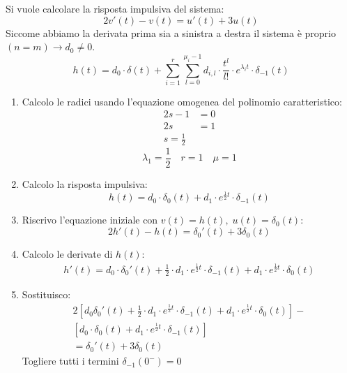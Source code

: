 \documentclass[a4paper]{article}
\begin{document}
\begin{exercise}
  Si vuole calcolare la risposta impulsiva del sistema:
  \[
    2v'(t) - v(t) = u'(t) + 3u(t)
  \] 
  Siccome abbiamo la derivata prima sia a sinistra a destra il sistema è proprio
  \( (n = m) \to d_0 \neq 0 \).
  \[
    h(t) = d_0 \cdot \delta(t) + \sum_{i=1}^{r} \sum_{l=0}^{\mu_i - 1} d_{i,l} \cdot
    \frac{t^l}{l!} \cdot e^{\lambda_i t} \cdot \delta_{-1}(t)
  \] 
  \begin{enumerate}
    \item Calcolo le radici usando l'equazione omogenea del polinomio caratteristico:
      \[
        \begin{aligned}
          2s - 1 &= 0\\
          2s &= 1\\
          s = \frac{1}{2}
        \end{aligned}
      \] 
      \[
        \lambda_1 = \frac{1}{2} \quad r = 1 \quad \mu = 1
      \] 

    \item Calcolo la risposta impulsiva:
      \[
        h(t) = d_0 \cdot \delta_0(t) + d_1 \cdot e^{\frac{1}{2}t} \cdot \delta_{-1}(t)
      \] 

    \item Riscrivo l'equazione iniziale con \( v(t) = h(t),\; u(t) = \delta_0(t) \):
      \[
        2h'(t) - h(t) = \delta_0'(t) + 3\delta_0(t)
      \] 

    \item Calcolo le derivate di \( h(t) \):
      \[
      \begin{aligned}
        h'(t) = d_0 \cdot \delta_0'(t) + \frac{1}{2} \cdot d_1 \cdot e^{\frac{1}{2}t}
        \cdot \delta_{-1}(t) + d_1 \cdot e^{\frac{1}{2}t} \cdot \delta_0(t)
      \end{aligned}
      \] 

    \item Sostituisco:
      \[
        \begin{aligned}
          2 \left[ d_0 \delta_0'(t) + \frac{1}{2} \cdot d_1 \cdot e^{\frac{1}{2}t} \cdot
          \delta_{-1}(t) + d_1 \cdot e^{\frac{1}{2}t} \cdot \delta_0(t) \right] -\\
          \left[ d_0 \cdot \delta_0(t) + d_1 \cdot e^{\frac{1}{2}t} \cdot \delta_{-1}(t) \right]\\
          = \delta_0'(t) + 3\delta_0(t)
        \end{aligned}
      \] 
      Togliere tutti i termini \( \delta_{-1}(0^-) = 0 \) 


\end{enumerate}
\end{exercise}
\end{document}

